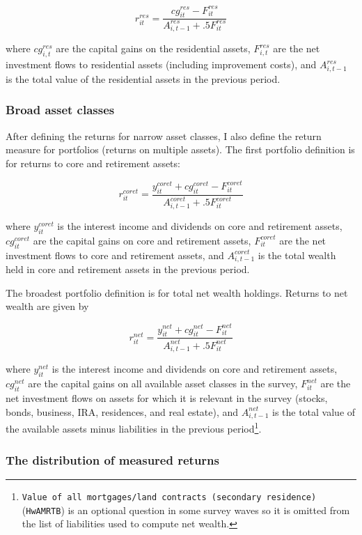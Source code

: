 $$ r^{res}_{it} = \frac{cg^{res}_{it} - F^{res}_{it}}{A^{res}_{i,t-1} + .5F^{res}_{it}}   $$

where  $cg^{res}_{i,t}$ are the capital gains on the residential assets, $F^{res}_{i,t}$ are the net investment flows to residential assets (including improvement costs), and $A^{res}_{i,t-1}$ is the total value of the residential assets in the previous period.

\subsubsection{Broad asset classes}

\par After defining the returns for narrow asset classes, I also define the return measure for portfolios (returns on multiple assets). The first portfolio definition is for returns to core and retirement assets: 

$$ r^{coret}_{it} = \frac{y^{coret}_{it} + cg^{coret}_{it} - F^{coret}_{it}}{A^{coret}_{i,t-1} + .5F^{coret}_{it}}   $$

where $y^{coret}_{it}$ is the interest income and dividends on core and retirement assets, $cg^{coret}_{it}$ are the capital gains on core and retirement assets, $F^{coret}_{it}$ are the net investment flows to core and retirement assets, and $A^{coret}_{i,t-1}$ is the total wealth held in core and retirement assets in the previous period.

\par The broadest portfolio definition is for total net wealth holdings. Returns to net wealth are given by

$$ r^{net}_{it} = \frac{y^{net}_{it} + cg^{net}_{it} - F^{net}_{it}}{A^{net}_{i,t-1} + .5F^{net}_{it}}   $$

where $y^{net}_{it}$ is the interest income and dividends on core and retirement assets, $cg^{net}_{it}$ are the capital gains on all available asset classes in the survey, $F^{net}_{it}$ are the net investment flows on assets for which it is relevant in the survey (stocks, bonds, business, IRA, residences, and real estate), and $A^{net}_{i,t-1}$ is the total value of the available assets minus liabilities in the previous period\footnote{\texttt{Value of all mortgages/land contracts (secondary residence)} (\texttt{HwAMRTB}) is an optional question in some survey waves so it is omitted from the list of liabilities used to compute net wealth.}.

\subsubsection{The distribution of measured returns}

